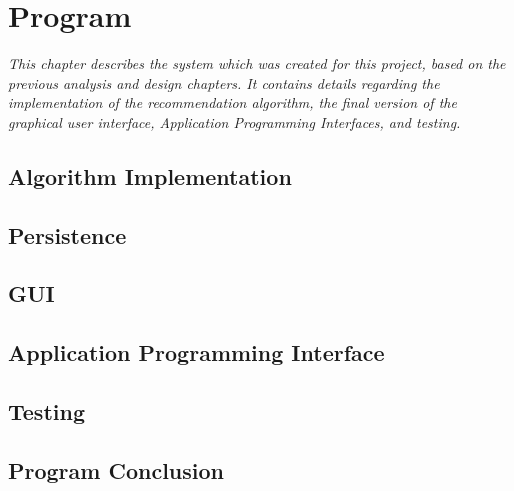 \chapter{Program}

\textit{This chapter describes the system which was created for this project, based on the previous analysis and design chapters. It contains details regarding the implementation of the recommendation algorithm, the final version of the graphical user interface, Application Programming Interfaces, and testing.}

\section{Algorithm Implementation}
\label{AlgorithmProg}

\section{Persistence}
\label{Persistence}

\section{GUI}
\label{GUI}

\section{Application Programming Interface}
\label{API}

\section{Testing}
\label{Testing}

\section{Program Conclusion}
\label{ProCon}
